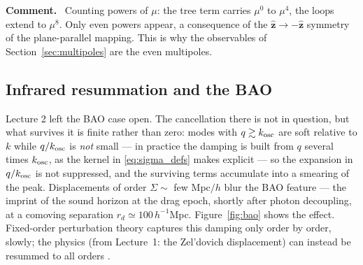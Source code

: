 \documentclass[a4paper,11pt]{article}
\newcommand{\nhat}{\hat{\bm{z}}}
\numberwithin{equation}{section}
\newenvironment{remark}
  {\par\medskip\noindent\begingroup\small\color{ForestGreen!60!black}\textbf{Comment.}\ }
  {\endgroup\par\medskip}
\begin{document}
\begin{remark}
Counting powers of $\mu$: the tree term carries $\mu^0$ to $\mu^4$, the loops extend to $\mu^8$. Only even powers appear, a consequence of the $\nhat \to -\nhat$ symmetry of the plane-parallel mapping. This is why the observables of Section~\ref{sec:multipoles} are the even multipoles.
\end{remark}

\subsection{Infrared resummation and the BAO}
\label{sec:ir}

Lecture 2 left the BAO case open. The cancellation there is not in question, but what survives it is finite rather than zero: modes with $q \gtrsim k_{\rm osc}$ are soft relative to $k$ while $q/k_{\rm osc}$ is \emph{not} small --- in practice the damping is built from $q$ several times $k_{\rm osc}$, as the kernel in \eqref{eq:sigma_defs} makes explicit --- so the expansion in $q/k_{\rm osc}$ is not suppressed, and the surviving terms accumulate into a smearing of the peak. Displacements of order $\Sigma \sim$ few Mpc$/h$ blur the BAO feature --- the imprint of the sound horizon at the drag epoch, shortly after photon decoupling, at a comoving separation $r_d \simeq 100\,h^{-1}$Mpc. Figure~\ref{fig:bao} shows the effect. Fixed-order perturbation theory captures this damping only order by order, slowly; the physics (from Lecture~1: the Zel'dovich displacement) can instead be resummed to all orders \cite{Senatore2014,Blas2016,IvanovSibiryakov2018}.
\end{document}
